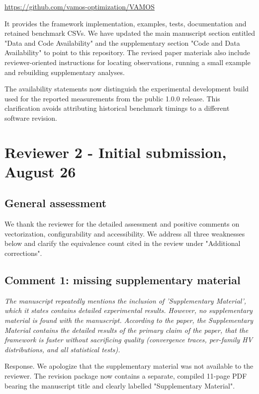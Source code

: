 \documentclass[11pt,letterpaper]{article}
\newcommand{\response}[1]{{\color{response}#1}\par}
\newcommand{\reviewercomment}[1]{{\itshape #1}\par}
\begin{document}
\response{\url{https://github.com/vamos-optimization/VAMOS}}
\response{It provides the framework implementation, examples, tests, documentation and retained benchmark CSVs. We have updated the main manuscript section entitled "Data and Code Availability" and the supplementary section "Code and Data Availability" to point to this repository. The revised paper materials also include reviewer-oriented instructions for locating observations, running a small example and rebuilding supplementary analyses.}

\response{The availability statements now distinguish the experimental development build used for the reported measurements from the public 1.0.0 release. This clarification avoids attributing historical benchmark timings to a different software revision.}

\newpage
\section*{Reviewer 2 - Initial submission, August 26}

\subsection*{General assessment}

\response{We thank the reviewer for the detailed assessment and positive comments on vectorization, configurability and accessibility. We address all three weaknesses below and clarify the equivalence count cited in the review under "Additional corrections".}

\subsection*{Comment 1: missing supplementary material}

\reviewercomment{The manuscript repeatedly mentions the inclusion of 'Supplementary Material', which it states contains detailed experimental results. However, no supplementary material is found with the manuscript. According to the paper, the Supplementary Material contains the detailed results of the primary claim of the paper, that the framework is faster without sacrificing quality (convergence traces, per-family HV distributions, and all statistical tests).}

\response{Response. We apologize that the supplementary material was not available to the reviewer. The revision package now contains a separate, compiled 11-page PDF bearing the manuscript title and clearly labelled "Supplementary Material".}
\end{document}
